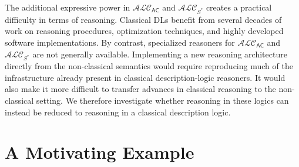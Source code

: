 \documentclass[letterpaper]{article} %
\theoremstyle{definition}
\theoremstyle{definition}
\theoremstyle{definition}
\theoremstyle{definition}
\theoremstyle{definition}
\begin{document}
The additional expressive power in $\mathcal{ALC}_\mathsf{AC}$ and $\mathcal{ALC}_{S^\ast}$ creates a practical difficulty in terms of reasoning. Classical DLs benefit from several decades of work on reasoning procedures, optimization techniques, and highly developed software implementations. By contrast, specialized reasoners for $\mathcal{ALC}_\mathsf{AC}$ and $\mathcal{ALC}_{S^\ast}$ are not generally available. Implementing a new reasoning architecture directly from the non-classical semantics would require reproducing much of the infrastructure already present in classical description-logic reasoners. It would also make it more difficult to transfer advances in classical reasoning to the non-classical setting. We therefore investigate whether reasoning in these logics can instead be reduced to reasoning in a classical description logic. 





\section{A Motivating Example}
\end{document}
